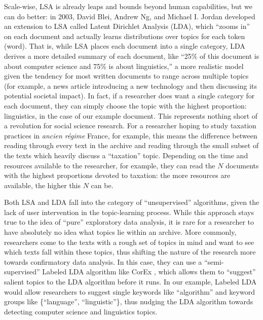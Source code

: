 Scale-wise, LSA is already leaps and bounds beyond human capabilities, but we can do better: in 2003, David Blei, Andrew Ng, and Michael I. Jordan developed an extension to LSA called Latent Dirichlet Analysis (LDA), which ``zooms in'' on each document and actually learns distributions over topics for each token (word). That is, while LSA places each document into a single category, LDA derives a more detailed summary of each document, like ``25\% of this document is about computer science and 75\% is about linguistics,'' a more realistic model given the tendency for most written documents to range across multiple topics (for example, a news article introducing a new technology and then discussing its potential societal impact). In fact, if a researcher does want a single category for each document, they can simply choose the topic with the highest proportion: linguistics, in the case of our example document. This represents nothing short of a revolution for social science research. For a researcher hoping to study taxation practices in \textit{ancien régime} France, for example, this means the difference between reading through every text in the archive and reading through the small subset of the texts which heavily discuss a ``taxation'' topic. Depending on the time and resources available to the researcher, for example, they can read the $N$ documents with the highest proportions devoted to taxation: the more resources are available, the higher this $N$ can be.

Both LSA and LDA fall into the category of ``unsupervised'' algorithms, given the lack of user intervention in the topic-learning process. While this approach stays true to the idea of ``pure'' exploratory data analysis, it is rare for a researcher to have absolutely no idea what topics lie within an archive. More commonly, researchers come to the texts with a rough set of topics in mind and want to see which texts fall within these topics, thus shifting the nature of the research more towards confirmatory data analysis. In this case, they can use a ``semi-supervised'' Labeled LDA algorithm like CorEx \citep{gallagher_anchored_2017}, which allows them to ``suggest'' salient topics to the LDA algorithm before it runs. In our example, Labeled LDA would allow researchers to suggest single keywords like ``algorithm'' and keyword groups like \{``language'', ``linguistic''\}, thus nudging the LDA algorithm towards detecting computer science and linguistics topics.

